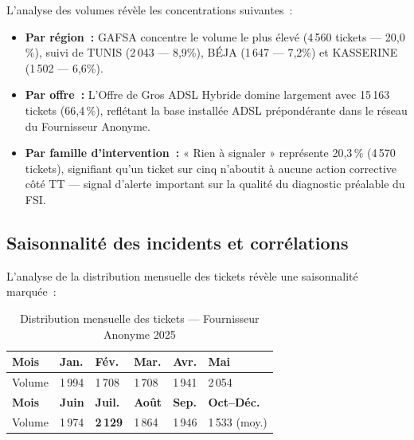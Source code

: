 \documentclass[10pt,a4paper]{report}
\begin{document}
L'analyse des volumes révèle les concentrations suivantes~:

\begin{itemize}[leftmargin=*, itemsep=4pt]
  \item \textbf{Par région~:} GAFSA concentre le volume le plus élevé (4\,560 tickets --- 20,0\,\%), suivi de TUNIS (2\,043 --- 8,9\%), BÉJA (1\,647 --- 7,2\%) et KASSERINE (1\,502 --- 6,6\%).
  \item \textbf{Par offre~:} L'Offre de Gros ADSL Hybride domine largement avec 15\,163 tickets (66,4\,\%), reflétant la base installée ADSL prépondérante dans le réseau du Fournisseur Anonyme.
  \item \textbf{Par famille d'intervention~:} « Rien à signaler » représente 20,3\,\% (4\,570 tickets), signifiant qu'un ticket sur cinq n'aboutit à aucune action corrective côté TT --- signal d'alerte important sur la qualité du diagnostic préalable du FSI.
\end{itemize}

\subsection{Saisonnalité des incidents et corrélations}

L'analyse de la distribution mensuelle des tickets révèle une saisonnalité marquée~:

\begin{table}[H]
\centering
\caption{Distribution mensuelle des tickets --- Fournisseur Anonyme 2025}
\begin{tabularx}{\textwidth}{C{1.5cm} C{2.5cm} C{2.5cm} C{2.5cm} C{2.5cm} C{2.5cm}}
\toprule
{}
\textbf{\color{ttblue}Mois} & \textbf{\color{ttblue}Jan.} & \textbf{\color{ttblue}Fév.} & \textbf{\color{ttblue}Mar.} & \textbf{\color{ttblue}Avr.} & \textbf{\color{ttblue}Mai} \\
\midrule
Volume & 1\,994 & 1\,708 & 1\,708 & 1\,941 & 2\,054 \\
\textbf{\color{ttblue}Mois} & \textbf{\color{ttblue}Juin} & \textbf{\color{ttblue}Juil.} & \textbf{\color{ttblue}Août} & \textbf{\color{ttblue}Sep.} & \textbf{\color{ttblue}Oct--Déc.} \\
Volume & 1\,974 & \textbf{2\,129} & 1\,864 & 1\,946 & 1\,533 (moy.) \\
\bottomrule
\end{tabularx}
\label{tab:monthly}
\end{table}
\end{document}
